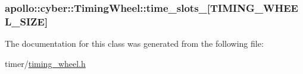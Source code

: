 \hypertarget{classapollo_1_1cyber_1_1TimingWheel_a9dbb67035af423a67b8b725d80ba2920}{
\subsubsection[{time\-\_\-slots\-\_\-}]{ apollo\-::cyber\-::\-Timing\-Wheel\-::time\-\_\-slots\-\_\-\mbox{[}{\bf T\-I\-M\-I\-N\-G\-\_\-\-W\-H\-E\-E\-L\-\_\-\-S\-I\-Z\-E}\mbox{]}\hspace{0.3cm}{\ttfamily [private]}}}\label{classapollo_1_1cyber_1_1TimingWheel_a9dbb67035af423a67b8b725d80ba2920}


The documentation for this class was generated from the following file\-:\begin{DoxyCompactItemize}
\item 
timer/\hyperlink{timing__wheel_8h}{timing\-\_\-wheel.\-h}\end{DoxyCompactItemize}
